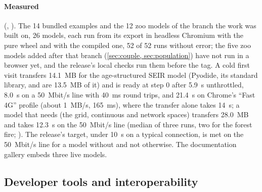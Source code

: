 \paragraph{Measured} (, ). The 14
bundled examples and the 12 zoo models of the branch the work was built on, 26 models, each
run from its export in headless Chromium with the pure wheel and with the compiled one, 52 of
52 runs without error; the five zoo models added after that branch (\cref{sec:couple,
sec:population}) have not run in a browser yet, and the release's local checks run them
before the tag. A cold first visit transfers 14.1~MB for the age-structured SEIR model
(Pyodide, its standard library,  and  are 13.5~MB of it) and is
ready at step 0 after 5.9~s unthrottled, 8.0~s on a 50~Mbit/s line with 40~ms round trips, and
21.4~s on Chrome's ``Fast 4G'' profile (about 1~MB/s, 165~ms), where the transfer alone takes
14~s; a model that needs  (the grid, continuous and network spaces) transfers
28.0~MB and takes 12.3~s on the 50~Mbit/s line (median of three runs, two for the forest
fire; ). The release's target, under 10~s on a typical
connection, is met on the 50~Mbit/s line for a model without  and not otherwise.
The documentation gallery embeds three live models.

\subsection{Developer tools and interoperability}
\label{sec:tools}

